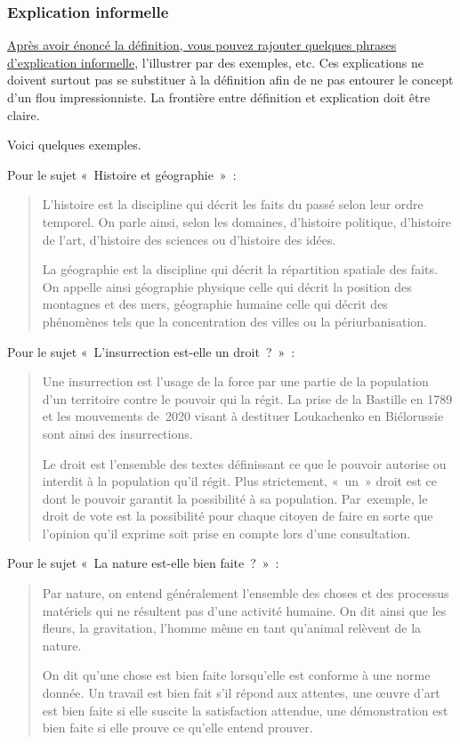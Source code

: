 \documentclass[a4paper,12pt]{article}
\begin{document}
\subsubsection{Explication informelle}
\label{sec-2-2-3}

\uline{Après avoir énoncé la définition, vous pouvez rajouter quelques phrases
d'explication informelle}, l'illustrer par des exemples, etc. Ces
explications ne doivent surtout pas se substituer à la définition afin
de ne pas entourer le concept d'un flou impressionniste. La frontière
entre définition et explication doit être claire.

Voici quelques exemples.

Pour le sujet « Histoire et géographie » : 
\begin{quotation}
L'histoire est la discipline qui décrit les faits
du passé selon leur ordre temporel. On parle
ainsi, selon les domaines, d'histoire politique,
d'histoire de l'art, d'histoire des sciences ou d'histoire des idées.

La géographie est la discipline qui décrit la
répartition spatiale des faits. On appelle ainsi
géographie physique celle qui décrit la position des montagnes et des
mers, géographie humaine celle qui décrit des phénomènes tels que la
concentration des villes ou la périurbanisation.
\end{quotation}

Pour le sujet « L'insurrection est-elle un droit ? » : 
\begin{quotation}
Une insurrection est l'usage de la force par une
partie de la population d'un territoire contre le pouvoir qui la régit.
La prise de la Bastille en 1789 et les mouvements
de 2020 visant à destituer Loukachenko en Biélorussie sont ainsi des
insurrections.

Le droit est l'ensemble des textes définissant ce
que le pouvoir autorise ou interdit à la population qu'il régit. Plus
strictement, « un » droit est ce dont le pouvoir garantit la possibilité
à sa population. Par exemple, le droit de vote
est la possibilité pour chaque citoyen de faire en sorte que l'opinion
qu'il exprime soit prise en compte lors d'une consultation.
\end{quotation}

Pour le sujet « La nature est-elle bien faite ? » : 
\begin{quotation}
Par nature, on entend généralement l'ensemble des
choses et des processus matériels qui ne résultent pas d'une activité
humaine. On dit ainsi que les fleurs, la
gravitation, l'homme même en tant qu'animal relèvent de la nature.

On dit qu'une chose est bien faite lorsqu'elle est
conforme à une norme donnée. Un travail est bien
fait s'il répond aux attentes, une œuvre d'art
est bien faite si elle suscite la satisfaction attendue, une
démonstration est bien faite si elle prouve ce qu'elle entend prouver.
\end{quotation}
\end{document}
